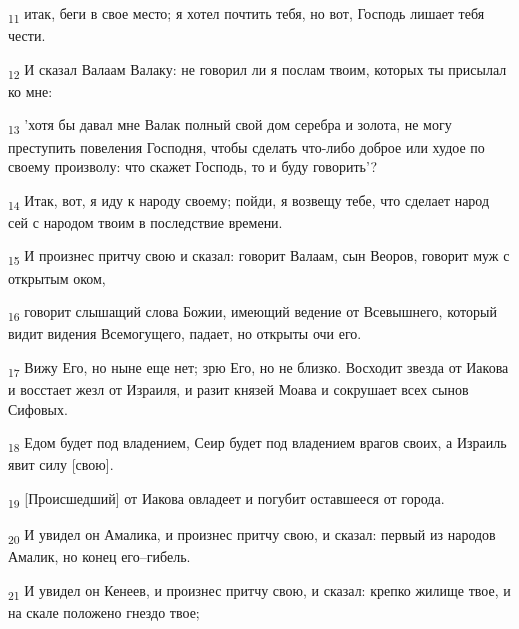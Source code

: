 \begin{tcolorbox}
\textsubscript{11} итак, беги в свое место; я хотел почтить тебя, но вот, Господь лишает тебя чести.
\end{tcolorbox}
\begin{tcolorbox}
\textsubscript{12} И сказал Валаам Валаку: не говорил ли я послам твоим, которых ты присылал ко мне:
\end{tcolorbox}
\begin{tcolorbox}
\textsubscript{13} 'хотя бы давал мне Валак полный свой дом серебра и золота, не могу преступить повеления Господня, чтобы сделать что-либо доброе или худое по своему произволу: что скажет Господь, то и буду говорить'?
\end{tcolorbox}
\begin{tcolorbox}
\textsubscript{14} Итак, вот, я иду к народу своему; пойди, я возвещу тебе, что сделает народ сей с народом твоим в последствие времени.
\end{tcolorbox}
\begin{tcolorbox}
\textsubscript{15} И произнес притчу свою и сказал: говорит Валаам, сын Веоров, говорит муж с открытым оком,
\end{tcolorbox}
\begin{tcolorbox}
\textsubscript{16} говорит слышащий слова Божии, имеющий ведение от Всевышнего, который видит видения Всемогущего, падает, но открыты очи его.
\end{tcolorbox}
\begin{tcolorbox}
\textsubscript{17} Вижу Его, но ныне еще нет; зрю Его, но не близко. Восходит звезда от Иакова и восстает жезл от Израиля, и разит князей Моава и сокрушает всех сынов Сифовых.
\end{tcolorbox}
\begin{tcolorbox}
\textsubscript{18} Едом будет под владением, Сеир будет под владением врагов своих, а Израиль явит силу [свою].
\end{tcolorbox}
\begin{tcolorbox}
\textsubscript{19} [Происшедший] от Иакова овладеет и погубит оставшееся от города.
\end{tcolorbox}
\begin{tcolorbox}
\textsubscript{20} И увидел он Амалика, и произнес притчу свою, и сказал: первый из народов Амалик, но конец его--гибель.
\end{tcolorbox}
\begin{tcolorbox}
\textsubscript{21} И увидел он Кенеев, и произнес притчу свою, и сказал: крепко жилище твое, и на скале положено гнездо твое;
\end{tcolorbox}
